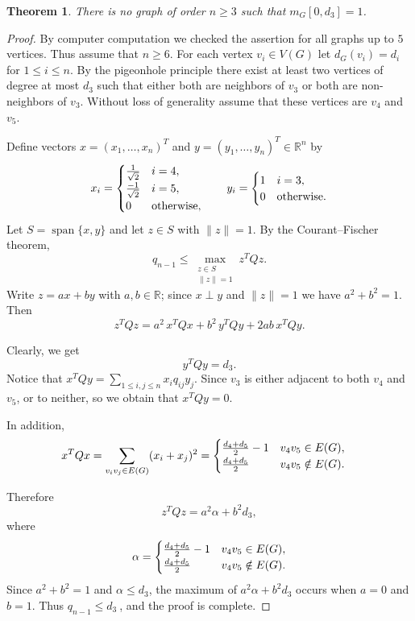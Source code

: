 \documentclass[preprint,12pt]{elsarticle}
\newtheorem{theorem}{Theorem}[section]
\begin{document}
\begin{theorem}
There is no graph of order $n \ge 3$ such that ${m_G}[0,{d_3}] = 1$.
\end{theorem}

\begin{proof}
By computer computation we checked the assertion for all graphs up to $5$ vertices.
Thus assume that $n\ge 6$. For each vertex $v_i\in V(G)$ let $d_G(v_i)=d_i$ for $1\le i\le n$.
By the pigeonhole principle there exist at least two vertices of degree at most $d_3$ such that either both are neighbors of $v_3$ or both are non-neighbors of $v_3$. Without loss of generality assume that these vertices are $v_4$ and $v_5$.

\noindent Define vectors $x=(x_1,\dots,x_n)^T$ and $y=(y_1,\dots,y_n)^T\in\mathbb{R}^n$ by
\[
 \begin{aligned}
 x_i=
 \begin{cases}
 {1 \over \sqrt{2}} & i = 4,\\
 {-1 \over \sqrt{2}} & i = 5,\\
 0 & \text{otherwise},
 \end{cases}
 \qquad
 y_i=
 \begin{cases}
 1 & i = 3,\\
 0 & \text{otherwise}.
 \end{cases}
 \end{aligned}
 \]
Let $S=\operatorname{span}\{x,y\}$ and let $z\in S$ with $\|z\|=1$.
By the Courant--Fischer theorem,
\[
q_{n-1}\le \max_{\substack{z\in S\\ \|z\|=1}} z^T Q z.
\]
Write $z=a x + b y$ with $a,b\in\mathbb{R}$; since $x\perp y$ and $\|z\|=1$ we have $a^2+b^2=1$.
Then
\[
z^T Q z = a^2\, x^T Q x + b^2\, y^T Q y + 2ab\, x^T Q y.
\]

\noindent Clearly, we get
\[
y^T Q y = d_3.
\]
Notice that ${x^T}Qy = \sum\limits_{1 \le i,j \le n} {{x_i}{q_{ij}}{y_j}} $. Since $v_3$ is either adjacent to both $v_4$ and $v_5$, or to neither, so we obtain that ${x^T}Qy = 0.$

\noindent In addition,
\[
 \begin{aligned}
 x^T Q x &=\sum_{v_i v_j\in E(G)} (x_i+x_j)^2=
 \begin{cases}
 {{{{d_4} + {d_5}} \over 2} - 1} & v_4v_5\in E(G),\\
 {{{{d_4} + {d_5}} \over 2}} & v_4v_5\notin E(G).\\
 \end{cases}
 \end{aligned}
\]

\noindent Therefore
\[
z^T Q z = a^2 \alpha + b^2 d_3,
\]
where
\[
\alpha =
\begin{cases}
{{{{d_4} + {d_5}} \over 2} - 1} & v_4v_5\in E(G),\\
 {{{{d_4} + {d_5}} \over 2}} & v_4v_5\notin E(G).\\
\end{cases}
\]
Since $a^2+b^2=1$ and $\alpha \le {d_3}$, the maximum of $a^2 \alpha + b^2 d_3$ occurs when $a=0$ and $b=1$.
Thus ${q_{n - 1}} \le {d_3}\ $, and the proof is complete.
\end{proof}
\end{document}
